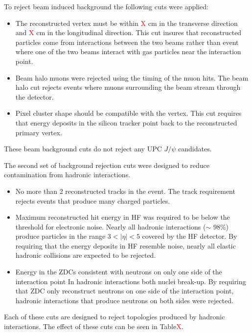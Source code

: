      To reject beam induced background the following cuts were applied:
      \begin{itemize}
        \item The reconstructed vertex must be within \textcolor{red}{X} cm in 
          the transverse direction and \textcolor{red}{X} cm in the 
          longitudinal direction. This cut insures that reconstructed particles 
          come from interactions between the two beams rather than event where 
          one of the two beams interact with gas particles near the interaction 
          point. 
  	    \item Beam halo muons were rejected using the timing of the muon hits.
              The beam halo cut rejects events where muons surrounding the beam 
              stream through the detector. 
  	    \item Pixel cluster shape should be compatible with the vertex. 
          This cut requires that energy deposits in the silicon tracker point 
            back to the reconstructed  primary vertex. 
      \end{itemize}
      These beam background cuts do not reject any UPC $J/\psi$ candidates. 
  
      The second set of background rejection cuts were designed to 
        reduce contamination from hadronic interactions. 
      \begin{itemize}
  	    \item No more than 2 reconstructed tracks in the event.
          The track requirement rejects events that produce many charged 
          particles.
  	    \item Maximum reconstructed hit energy in HF was required to be below 
            the threshold for electronic noise. 
          Nearly all hadronic interactions ($\sim$ 98\%) produce particles in the 
            range $3<|\eta|<5$ covered by the HF detector.
          By requiring that the energy deposits in HF resemble noise, nearly all
            elastic hadronic collisions are expected to be rejected.
  	    \item Energy in the ZDCs consistent with neutrons on only one side 
            of the interaction point
          In hadronic interactions both nuclei break-up. 
          By requiring that ZDC only reconstruct neutrons on one side of the 
            interaction point, hadronic interactions that produce neutrons on both 
            sides were rejected.
      \end{itemize}
      Each of these cuts are designed to reject topologies produced by hadronic
        interactions.
      The effect of these cuts can be seen in Table\textcolor{red}{X}.
  
